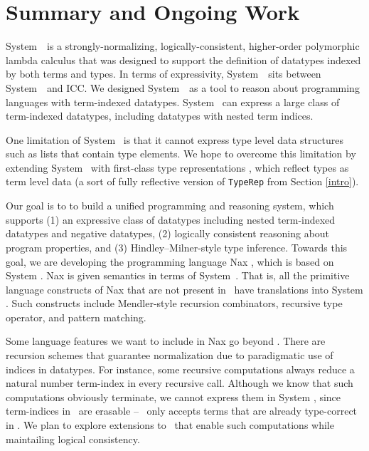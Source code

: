 \section{Summary and Ongoing Work} \label{sec:concl}
System~\Fi\ is a strongly-normalizing, logically-consistent, higher-order
polymorphic lambda calculus that was designed to support the
definition of datatypes indexed by both terms and types.
In terms of expressivity, System~\Fi\ sits between System~\Fw\ and ICC.
We designed System~\Fi\ as a tool to reason about programming
languages with term-indexed datatypes. System \Fi\ can express
a large class of term-indexed datatypes, including datatypes with nested term
indices.

One limitation of System \Fi\ is that it cannot express type level
data structures such as lists that contain type elements.
We hope to overcome this limitation by extending System \Fi\ 
with first-class type representations \cite{DagMcb12}, which reflect
types as term level data (a sort of fully reflective version of
{\small\tt TypeRep} from Section \ref{intro}).

Our goal is to to build a unified programming and reasoning system,
which supports
(1) an expressive class of datatypes including nested term-indexed datatypes
and negative datatypes,
(2) logically consistent reasoning about program properties, and
(3) Hindley--Milner-style type inference.
Towards this goal, we are developing the programming language Nax \cite{AhnSheFioPit12},
which is based on System \Fi. Nax is given semantics in terms of System~\Fi.
That is, all the primitive language constructs of Nax that are not present
in \Fi\ have translations into System \Fi. Such constructs include
Mendler-style recursion combinators, recursive type operator, and
pattern matching.

Some language features we want to include in Nax go beyond \Fi.
There are recursion schemes that guarantee normalization due to paradigmatic use
of indices in datatypes. For instance, some recursive computations always
reduce a natural number term-index in every recursive call.
Although we know that such computations obviously terminate, we cannot express
them in System \Fi, since term-indices in \Fi\ are erasable -- \Fi\ only
accepts terms that are already type-correct in \Fw.
We plan to explore extensions to \Fi\ that enable such computations
while maintailing logical consistency.

